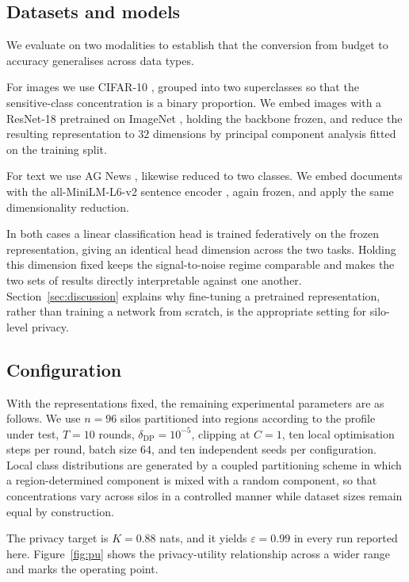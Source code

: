 \documentclass[acmsmall,screen,review,anonymous]{acmart}
\theoremstyle{acmdefinition}%
\begin{document}
\subsection{Datasets and models}

We evaluate on two modalities to establish that the conversion from budget to
accuracy generalises across data types.

For images we use CIFAR-10 \cite{krizhevsky2009cifar}, grouped into two
superclasses so that the sensitive-class concentration is a binary proportion. We
embed images with a ResNet-18 \cite{he2016resnet} pretrained on ImageNet
\cite{deng2009imagenet}, holding the backbone frozen, and reduce the resulting
representation to $32$ dimensions by principal component analysis fitted on the
training split.

For text we use AG News \cite{zhang2015agnews}, likewise reduced to two classes.
We embed documents with the all-MiniLM-L6-v2 sentence encoder
\cite{reimers2019sentencebert,wang2020minilm}, again frozen, and apply the same
dimensionality reduction.

In both cases a linear classification head is trained federatively on the frozen
representation, giving an identical head dimension across the two tasks. Holding
this dimension fixed keeps the signal-to-noise regime comparable and makes the
two sets of results directly interpretable against one another.
Section~\ref{sec:discussion} explains why fine-tuning a pretrained representation,
rather than training a network from scratch, is the appropriate setting for
silo-level privacy.

\subsection{Configuration}

With the representations fixed, the remaining experimental parameters are as follows. We use $n = 96$ silos partitioned into regions according to the profile under
test, $T = 10$ rounds, $\delta_{\mathrm{DP}} = 10^{-5}$, clipping at $C = 1$, ten
local optimisation steps per round, batch size $64$, and ten independent seeds
per configuration. Local class distributions are generated by a coupled
partitioning scheme in which a region-determined component is mixed with a random
component, so that concentrations vary across silos in a controlled manner while
dataset sizes remain equal by construction.

The privacy target is $K = 0.88$ nats, and it yields $\varepsilon = 0.99$ in every
run reported here. Figure~\ref{fig:pu} shows the privacy-utility relationship
across a wider range and marks the operating point.
\end{document}
